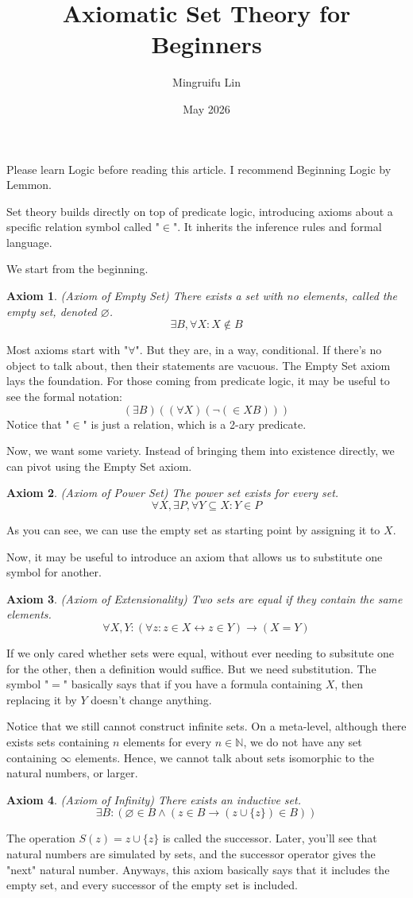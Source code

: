 \documentclass{article}
\title{Axiomatic Set Theory for Beginners}
\author{Mingruifu Lin}
\date{May 2026}
\newtheorem{axiom}{Axiom}
\begin{document}
\maketitle

Please learn Logic before reading this article. I recommend Beginning Logic by Lemmon.

Set theory builds directly on top of predicate logic, introducing axioms about a specific relation symbol called "$\in$". It inherits the inference rules and formal language.

We start from the beginning.
\begin{axiom}
    (Axiom of Empty Set) There exists a set with no elements, called the empty set, denoted $\varnothing$.
    $$\exists B, \forall X : X \not \in B$$
\end{axiom}

Most axioms start with "$\forall$". But they are, in a way, conditional. If there's no object to talk about, then their statements are vacuous. The Empty Set axiom lays the foundation. For those coming from predicate logic, it may be useful to see the formal notation:
$$(\exists B)((\forall X) (\neg (\in X B)))$$
Notice that "$\in$" is just a relation, which is a 2-ary predicate.

Now, we want some variety. Instead of bringing them into existence directly, we can pivot using the Empty Set axiom.
\begin{axiom}
    (Axiom of Power Set) The power set exists for every set.
    $$\forall X, \exists P, \forall Y \subseteq X : Y \in P$$
\end{axiom}
As you can see, we can use the empty set as starting point by assigning it to $X$.

Now, it may be useful to introduce an axiom that allows us to substitute one symbol for another.
\begin{axiom}
    (Axiom of Extensionality) Two sets are equal if they contain the same elements.
    $$\forall X, Y : (\forall z : z \in X \leftrightarrow z \in Y) \rightarrow (X = Y)$$
\end{axiom}
If we only cared whether sets were equal, without ever needing to subsitute one for the other, then a definition would suffice. But we need substitution. The symbol "$=$" basically says that if you have a formula containing $X$, then replacing it by $Y$ doesn't change anything.

Notice that we still cannot construct infinite sets. On a meta-level, although there exists sets containing $n$ elements for every $n \in \mathbb{N}$, we do not have any set containing $\infty$ elements. Hence, we cannot talk about sets isomorphic to the natural numbers, or larger.
\begin{axiom}
    (Axiom of Infinity) There exists an inductive set.
    $$\exists B : (\varnothing \in B \land (z \in B \rightarrow (z \cup \{ z \}) \in B))$$
\end{axiom}
The operation $S(z) = z \cup \{ z \}$ is called the successor. Later, you'll see that natural numbers are simulated by sets, and the successor operator gives the "next" natural number. Anyways, this axiom basically says that it includes the empty set, and every successor of the empty set is included.
\end{document}
